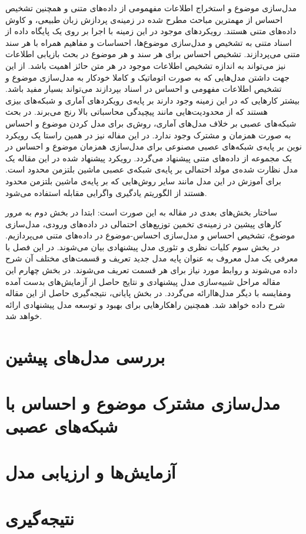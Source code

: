 \documentclass[12pt,a4paper]{article}
\begin{document}
مدل‌سازی موضوع و استخراج اطلاعات مفهمومی از داده‌های متنی و همچنین تشخیص احساس از مهمترین مباحث مطرح شده در زمینه‌ی پردازش زبان طبیعی، و کاوش داده‌های متنی هستند. رویکردهای موجود در این زمینه با اجرا بر روی یک پایگاه داده‌ از اسناد متنی به تشخیص و مدل‌سازی موضوع‌ها، احساسات و مفاهیم همراه با هر سند متنی می‌پردازند. تشخیص احساس برای هر سند و هر موضوع در بحث بازیابی اطلاعات نیز می‌‌تواند به اندازه تشخیص اطلاعات موجود در هر متن حائز اهمیت باشد. از این جهت داشتن مدل‌هایی که به صورت اتوماتیک و کاملا خودکار به مدل‌سازی موضوع و تشخیص اطلاعات مفهومی‌ و احساس در اسناد بپردازند می‌تواند بسیار مفید باشد. بیشتر کارهایی که در این زمینه وجود دارند بر پایه‌ی رویکردهای آماری و شبکه‌های بیزی هستند که از محدودیت‌هایی مانند پیچیدگی محاسباتی بالا رنج می‌برند. در بحث شبکه‌های عصبی بر خلاف مدل‌های آماری، روش‌ی برای مدل کردن موضوع و احساس به صورت همزمان و مشترک وجود ندارد. در این مفاله نیز در همین راستا یک رویکرد نوین‌ بر پایه‌ی شبکه‌های عصبی مصنوعی برای مدل‌سازی همزمان موضوع‌ و احساس‌ در یک مجموعه از داده‌های متنی پیشنهاد می‌گردد. رویکرد پیشنهاد شده در این مقاله یک مدل نظارت شده‌ی مولد احتمالی‌ بر پایه‌ی شبکه‌ی عصبی ماشین بلتزمن محدود است. برای آموزش در این مدل مانند سایر روش‌هایی که بر پایه‌ی ماشین بلتزمن محدود هستند از الگوریتم یادگیری واگرایی مقابله استفاده می‌‌شود.

ساختار بخش‌های بعدی در مقاله به این صورت است: ابتدا در بخش دوم به مرور کارهای پیشین در زمینه‌ی تخمین توزیع‌های احتمالی‌ در داده‌های ورودی، مدل‌سازی موضوع، تشخیص احساس و مدل‌سازی احساس‌-موضوع در داده‌های متنی می‌‌پردازیم. در بخش سوم کلیات نظری و تئوری مدل پیشنهادی بیان می‌‌شوند. در این فصل با معرفی‌ یک مدل معروف به عنوان پایه مدل جدید تعریف و قسمت‌های مختلف آن شرح داده می‌‌شوند و روابط مورد نیاز برای هر قسمت تعریف می‌‌شوند. در بخش چهارم این مقاله مراحل شبیه‌سازی مدل پیشنهادی و نتایج حاصل از آزمایش‌های بدست آمده ومفایسه با دیگر مدل‌هاارائه می‌گردد. در بخش پایانی، نتیجه‌گیری حاصل از این مقاله شرح داده خواهد شد. همچنین راهکارهایی برای بهبود و توسعه مدل پیشنهادی ارائه خواهد شد.

\section{ بررسی مدل‌های پیشین}

\section{مدل‌سازی مشترک موضوع و احساس با شبکه‌های عصبی}
	
\section{آزمایش‌ها و ارزیابی مدل}

\section{نتیجه‌گیری}
	


\newpage


\end{document}
